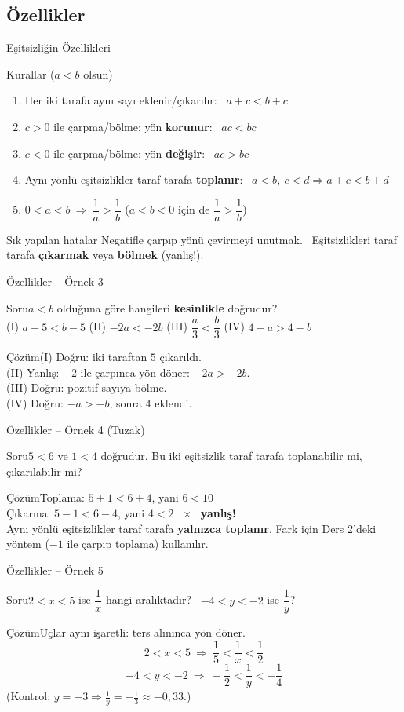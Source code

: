 \documentclass[aspectratio=169,11pt]{beamer}
\newcommand{\soru}[3]{%
\begin{frame}{#1}
  \begin{block}{Soru}\large #2\end{block}
  \pause
  \begin{exampleblock}{Çözüm}\large #3\end{exampleblock}
\end{frame}}
\begin{document}
\subsection{Özellikler}
\begin{frame}{Eşitsizliğin Özellikleri}
\begin{block}{Kurallar (\(a<b\) olsun)}
\begin{enumerate}
\item Her iki tarafa aynı sayı eklenir/çıkarılır: \ \(a+c<b+c\)
\item \(c>0\) ile çarpma/bölme: yön \textbf{korunur}: \ \(ac<bc\)
\item \(c<0\) ile çarpma/bölme: yön \textbf{değişir}: \ \(ac>bc\)
\item Aynı yönlü eşitsizlikler taraf tarafa \textbf{toplanır}: \ \(a<b,\ c<d\Rightarrow a+c<b+d\)
\item \(0<a<b\ \Rightarrow\ \dfrac1a>\dfrac1b\) \quad (\(a<b<0\) için de \(\dfrac1a>\dfrac1b\))
\end{enumerate}
\end{block}
\begin{alertblock}{Sık yapılan hatalar}
Negatifle çarpıp yönü çevirmeyi unutmak. \ Eşitsizlikleri taraf tarafa \textbf{çıkarmak} veya \textbf{bölmek} (yanlış!).
\end{alertblock}
\end{frame}

\soru{Özellikler -- Örnek 3}
{\(a<b\) olduğuna göre hangileri \textbf{kesinlikle} doğrudur?\\
(I) \(a-5<b-5\) \quad (II) \(-2a<-2b\) \quad (III) \(\dfrac a3<\dfrac b3\) \quad (IV) \(4-a>4-b\)}
{(I) Doğru: iki taraftan \(5\) çıkarıldı.\\
(II) Yanlış: \(-2\) ile çarpınca yön döner: \(-2a>-2b\).\\
(III) Doğru: pozitif sayıya bölme.\\
(IV) Doğru: \(-a>-b\), sonra \(4\) eklendi.}

\soru{Özellikler -- Örnek 4 (Tuzak)}
{\(5<6\) ve \(1<4\) doğrudur. Bu iki eşitsizlik taraf tarafa toplanabilir mi, çıkarılabilir mi?}
{Toplama: \(5+1<6+4\), yani \(6<10\) \ \checkmark\\[3pt]
Çıkarma: \(5-1<6-4\), yani \(4<2\) \ \(\times\) \ \textbf{yanlış!}\\[3pt]
Aynı yönlü eşitsizlikler taraf tarafa \textbf{yalnızca toplanır}. Fark için Ders 2'deki yöntem (\(-1\) ile çarpıp toplama) kullanılır.}

\soru{Özellikler -- Örnek 5}
{\(2<x<5\) ise \(\dfrac1x\) hangi aralıktadır? \ \(-4<y<-2\) ise \(\dfrac1y\)?}
{Uçlar aynı işaretli: ters alınınca yön döner.
\[2<x<5\ \Rightarrow\ \frac15<\frac1x<\frac12\]
\[-4<y<-2\ \Rightarrow\ -\frac12<\frac1y<-\frac14\]
(Kontrol: \(y=-3\Rightarrow \frac1y=-\frac13\approx-0{,}33\).)}
\end{document}

